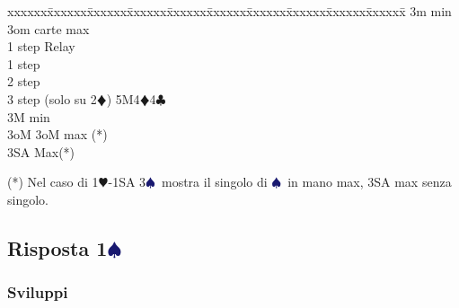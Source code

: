 \documentclass[a4paper,italian]{article}
\newcommand{\BC}{\textcolor{OliveGreen}{$\clubsuit$}}
\newcommand{\BD}{\textcolor{RedOrange}{$\vardiamondsuit$}}
\newcommand{\BH}{\textcolor{Red2}{$\varheartsuit${}}}
\newcommand{\BS}{\textcolor{MidnightBlue}{$\spadesuit${}}}
\newcommand{\pdfs}{\texorpdfstring{\BS{}}{S}}
\newenvironment{bidtable}
{\begin{tabbing}

    xxxxxx\=xxxxxx\=xxxxxx\=xxxxxx\=xxxxxx\=xxxxxx\=xxxxxx\=xxxxxx\=xxxxxx\=xxxxxx\=\kill}
{\end{tabbing} }%
\newenvironment{sviluppi}
{\begin{tcolorbox}[colframe=azzurro,title=Sviluppi particolari]}
    {
\end{tcolorbox} }%
\begin{document}
\begin{multicols*}{2}
\begin{sviluppi}
\begin{bidtable}
                                                3m  min\\
                                                3om  carte max\+\\
                                                1 step \> Relay\+\\
                                                1 step \\
                                                2 step \\
                                                3 step (solo su 2\BD)\>\> \> 5M4\BD4\BC\-\-\\
                                                3M  min\\
                                                3oM \> 3oM max (*)\\
                                                3SA \> Max(*)\-\\
                                            \end{bidtable}
                                            (*) Nel caso di 1\BH-1SA 3\BS\ mostra il singolo di \BS\ in mano max, 3SA max senza singolo.
                                        \end{sviluppi}

                                        \subsection{Risposta 1\pdfs}


                                        \subsubsection{Sviluppi}


\end{multicols*}
\end{document}
